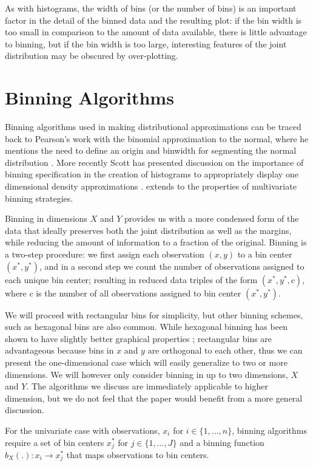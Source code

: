 \documentclass[11pt]{isuthesis}\usepackage[]{graphicx}\usepackage[]{color}
\begin{document}
As with histograms, the width of bins (or the number of bins) is an important factor in the detail of the binned data and the resulting plot: if the bin width is too small in comparison to the amount of data available, there is little advantage to binning, but if the bin width is too large, interesting features of the joint distribution may be obscured by over-plotting. 


\section{Binning Algorithms}
\label{GenBinning}

Binning algorithms used in making distributional approximations can be traced back to Pearson's work with the binomial approximation to the normal, where he mentions the need to define an origin and binwidth for segmenting the normal distribution \citep{Pearson1895}. More recently Scott has presented discussion on the importance of binning specification in the creation of histograms to appropriately display one dimensional density approximations \citep{scott1979}. \citet{scott1992} extends to the properties of multivariate binning strategies.

Binning in dimensions $X$ and $Y$ provides us with a more condensed form of the data that ideally preserves both the joint distribution as well as the margins, while reducing the amount of information to a fraction of the original.  Binning is a two-step procedure: we first assign each observation $(x, y)$ to a bin center $(x^\ast,y^\ast)$, and in a second step we count the number of observations assigned to each unique bin center; resulting in reduced data triples of the form $(x^\ast, y^\ast, c)$, where $c$ is the number of all observations assigned to bin center $(x^\ast,y^\ast)$.

We will proceed with rectangular bins for simplicity, but other binning schemes, such as hexagonal bins \citep{Carr1987} are also common.  While hexagonal binning has been shown to have slightly better graphical properties \citep{scott1992}; rectangular bins are advantageous because bins in $x$ and $y$ are orthogonal to each other, thus we can present the one-dimensional case which will easily generalize to two or more dimensions.  We will however only consider binning in up to two dimensions, $X$ and $Y$. The algorithms we discuss are immediately applicable to higher dimension, but we do not feel that the paper would benefit from a more general discussion.

For the univariate case with observations, $x_i$ for $i \in \{1,\dots,n\}$, binning algorithms require a set of bin centers $x_j^\ast$ for $j \in \{1,\dots,J\}$ and a binning function $b_X(.) : x_i \rightarrow x^\ast_j$ that maps observations to  bin centers. 
\end{document}
